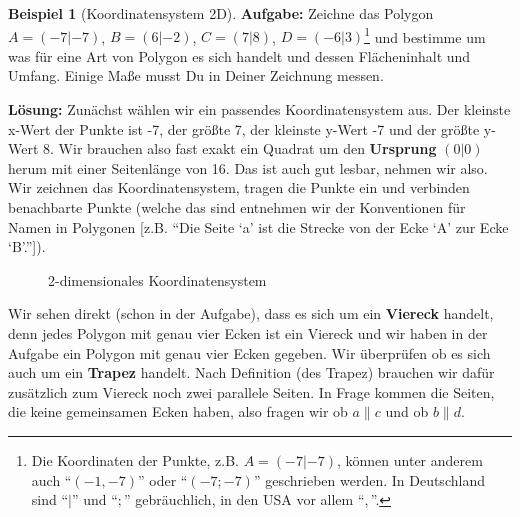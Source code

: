 \documentclass[a4paper]{book}%
\theoremstyle{definition}
\newtheorem{beispiel}{Beispiel}
\begin{document}
\begin{beispiel}[Koordinatensystem 2D]
\textbf{Aufgabe:} Zeichne das Polygon $A=(-7|-7)$, $B=(6|-2)$, $C=(7|8)$, $D=(-6|3)$\footnote{Die Koordinaten der Punkte, z.B. $A=(-7|-7)$, können unter anderem auch \enquote{$(-1,-7)$} oder \enquote{$(-7;-7)$} geschrieben werden. In Deutschland sind \enquote{$|$} und \enquote{$;$} gebräuchlich, in den USA vor allem \enquote{$,$}.} und bestimme um was für eine Art von Polygon es sich handelt und dessen Flächeninhalt und Umfang. Einige Maße musst Du in Deiner Zeichnung messen.

\textbf{Lösung:} Zunächst wählen wir ein passendes Koordinatensystem aus. Der kleinste x-Wert der Punkte ist -7, der größte 7, der kleinste y-Wert -7 und der größte y-Wert 8. Wir brauchen also fast exakt ein Quadrat um den \textbf{Ursprung} $(0|0)$ herum  mit einer Seitenlänge von 16. Das ist auch gut lesbar, nehmen wir also. Wir zeichnen das Koordinatensystem, tragen die Punkte ein und verbinden benachbarte Punkte (welche das sind entnehmen wir der Konventionen für Namen in Polygonen [z.B. \enquote{Die Seite \enquote{a} ist die Strecke von der Ecke \enquote{A} zur Ecke \enquote{B}.}]).

\begin{figure}[ht]
  \centering
  \caption{2-dimensionales Koordinatensystem}\label{fig:koordinatensystem2D}
\end{figure}

Wir sehen direkt (schon in der Aufgabe), dass es sich um ein \textbf{Viereck} handelt, denn jedes Polygon mit genau vier Ecken ist ein Viereck und wir haben in der Aufgabe ein Polygon mit genau vier Ecken gegeben. Wir überprüfen ob es sich auch um ein \textbf{Trapez} handelt. Nach Definition (des Trapez) brauchen wir dafür zusätzlich zum Viereck noch zwei parallele Seiten. In Frage kommen die Seiten, die keine gemeinsamen Ecken haben, also fragen wir ob $a \| c$ und ob $b \| d$.


\end{beispiel}
\end{document}
